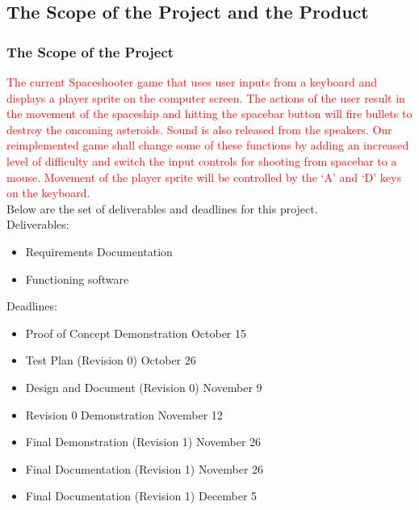 \documentclass[12pt, titlepage]{article}
\begin{document}
\subsection{The Scope of the Project and the Product}

\subsubsection{The Scope of the Project}

\textcolor{red}{The current Spaceshooter game that uses user inputs from a keyboard and displays a player sprite on the computer screen. The actions of the user result in the movement of the spaceship and hitting the spacebar button will fire bullets to destroy the oncoming asteroids. Sound is also released from the speakers. Our reimplemented game shall change some of these functions by adding an increased level of difficulty and switch the input controls for shooting from spacebar to a mouse. Movement of the player sprite will be controlled by the `A' and `D' keys on the keyboard.}
\newline
\\Below are the set of deliverables and deadlines for this project.
\newline
\\Deliverables:
\begin{itemize}
    \item Requirements Documentation
    \item Functioning software
\end{itemize}

\noindent Deadlines:
\begin{itemize}
    \item Proof of Concept Demonstration October 15
    \item Test Plan (Revision 0) October 26
    \item Design and Document (Revision 0) November 9
    \item Revision 0 Demonstration November 12
    \item Final Demonstration (Revision 1) November 26
    \item Final Documentation (Revision 1) November 26
    \item Final Documentation (Revision 1) December 5
\end{itemize}
\end{document}
